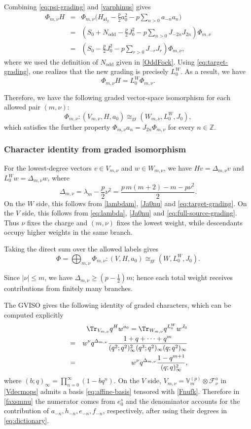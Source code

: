\documentclass[a4paper,11pt]{article}
\theoremstyle{definition}
\theoremstyle{definition}
\theoremstyle{remark}
\newcommand{\be}{\begin{equation}}
\newcommand{\ee}{\end{equation}}
\newcommand{\beqn}{\begin{eqnarray}}
\newcommand{\eeqn}{\end{eqnarray}}
\newcommand{\Z}{\mathbb Z}
\begin{document}
Combining \eqref{eq:psi-grading}   and \eqref{varphinus} gives 
\beqn
\Phi_{m,\nu}H &=&\Phi_{m,\nu} \Big(H_{\mathfrak{sl}_2}-\frac p2a_0^2
-p\sum_{n>0}a_{-n}a_n\Big) 
\\&= &
  \left(S_0+N_{\mathrm{odd}}-\frac p2J_0^2
-p\sum_{n>0}J_{-2n}J_{2n}\right)\Phi_{m,\nu}
\\&= &
 \left(S_0-\frac p2J_0^2
-p\sum_{r>0}J_{-r}J_r\right)\Phi_{m,\nu},
\eeqn
 where we used the definition of $N_{\text{odd}}$   given in \eqref{OddFock}. Using \eqref{eq:target-grading}, one realizes that the new grading is precisely $L_0^W$. As a result, we have
 \be
 \Phi_{m,\nu}H =L_0^W\Phi_{m,\nu}.\nonumber
 \ee
 
 Therefore, we have the following graded vector-space isomorphism
for   each allowed pair $(m,\nu)$:
\be
\Phi_{m,\nu}:(V_{m,\nu},H,a_0)
\cong_\text{gr}(W_{m,\nu},L_0^W,J_0),
\ee
which satisfies the further property 
$\Phi_{m,\nu}a_n=J_{2n}\Phi_{m,\nu}$ for every $n\in\Z$.
 

 

 
\subsubsection{Character identity from graded isomorphism   }\label{PhiSec}

 For the lowest-degree vectors $v\in V_{m,\nu}$ and $w\in W_{m,\nu}$, we have $Hv=\Delta_{m,\nu}v$ and $L_0^Ww=\Delta_{m,\nu}w$, where 
\be
\Delta_{m,\nu}
=\lambda_m-\frac p2\nu^2
=\frac{p\,m(m+2)-m-p\nu^2}{2}.
\label{eq:Delta-branch}
\ee
On the $W$ side, this follows from \eqref{lambdam}, \eqref{Ja0nu} and \eqref{eq:target-grading}. On the $V$ side, this follows from \eqref{eq:lambda},  \eqref{Ja0nu} and \eqref{eq:full-source-grading}.  
 Thus $\nu$ fixes the charge and $(m,\nu)$ fixes the lowest
weight, while descendants occupy higher weights in the same branch.



Taking the direct sum over the allowed labels gives
\be
\Phi=\bigoplus_{m,\nu}\Phi_{m,\nu}:
(V,H,a_0)\cong_\text{gr}(W,L_0^W,J_0).
\label{eq:global-Phi}
\ee
 
Since $|\nu|\leq m$, we have
$\Delta_{m,\nu}\geq(p-\tfrac12)m$; hence each total weight
receives contributions from finitely many branches.

The GVISO gives the following identity of graded characters, which can be computed
explicitly
  \beqn
&& \label{VWmnu}
\Tr_{V_{m,\nu}}q^Hw^{a_0}
=\Tr_{W_{m,\nu}}q^{L_0^W}w^{J_0}
\\&=& \label{faxsmnu}
w^\nu q^{\Delta_{m,\nu}}
\frac{1 + q + \cdots + q^m}{(q^2; q^2)_\infty^2 (q^3; q^2)_\infty (q; q^2)_\infty}
\\&=& 
w^\nu q^{\Delta_{m,\nu}}
\frac{1-q^{m+1}}{(q;q)_\infty^2},
\label{eq:branch-character}
\eeqn
where $(b;q)_\infty=\prod_{n=0}^\infty(1-bq^n)$. On the $V$ side, $ V_{m,\nu}=\mathbb V_m^{( p)}\otimes\mathcal F_\nu^a $ in \eqref{Vdecmops} admits a  basis   \eqref{eq:affine-basis} tensored with  \eqref{Fnufk}. Therefore in \eqref{faxsmnu} the numerator comes from $e_0^s$ and the denominator accounts for the contribution  of $a_{-n},h_{-n},e_{-n},f_{-n}$, respectively, after using their degrees in \eqref{eq:dictionary}.  
 
\end{document}
